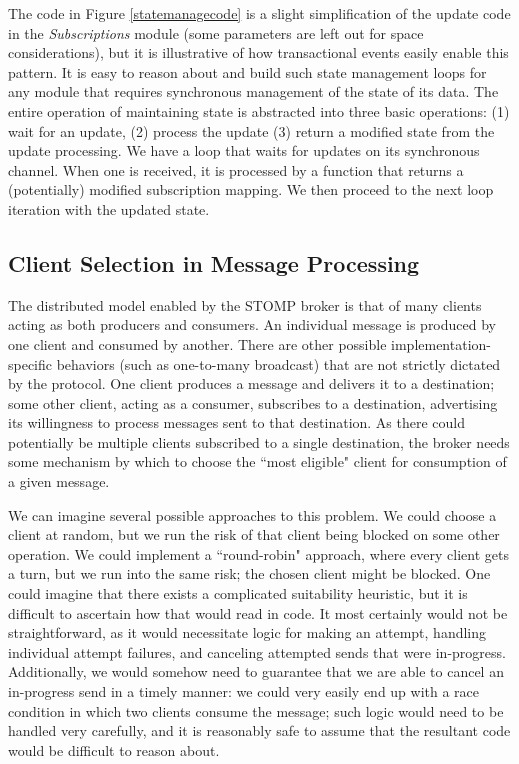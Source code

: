 \documentclass[conference, letterpaper]{IEEEtran}
\begin{document}
The code in Figure \ref{statemanagecode} is a slight simplification of the update code in the \textit{Subscriptions} module (some parameters are left out for space considerations), but it is illustrative of how transactional events easily enable this pattern. It is easy to reason about and build such state management loops for any module that requires synchronous management of the state of its data. The entire operation of maintaining state is abstracted into three basic operations: (1) wait for an update, (2) process the update  (3) return a modified state from the update processing. We have a loop that waits for updates on its synchronous channel. When one is received, it is processed by a function that returns a (potentially) modified subscription mapping. We then proceed to the next loop iteration with the updated state.

\subsection{Client Selection in Message Processing}

The distributed model enabled by the STOMP broker is that of many clients acting as both producers and consumers. An individual message is produced by one client and consumed by another. There are other possible implementation-specific behaviors (such as one-to-many broadcast) that are not strictly dictated by the protocol. One client produces a message and delivers it to a destination; some other client, acting as a consumer, subscribes to a destination, advertising its willingness to process messages sent to that destination. As there could potentially be multiple clients subscribed to a single destination, the broker needs some mechanism by which to choose the ``most eligible" client for consumption of a given message. 

We can imagine several possible approaches to this problem. We could choose a client at random, but we run the risk of that client being blocked on some other operation. We could implement a ``round-robin" approach, where every client gets a turn, but we run into the same risk; the chosen client might be blocked. One could imagine that there exists a complicated suitability heuristic, but it is difficult to ascertain how that would read in code. It most certainly would not be straightforward, as it would necessitate logic for making an attempt, handling individual attempt failures, and canceling attempted sends that were in-progress. Additionally, we would somehow need to guarantee that we are able to cancel an in-progress send in a timely manner: we could very easily end up with a race condition in which two clients consume the message; such logic would need to be handled very carefully, and it is reasonably safe to assume that the resultant code would be difficult to reason about.
\end{document}

